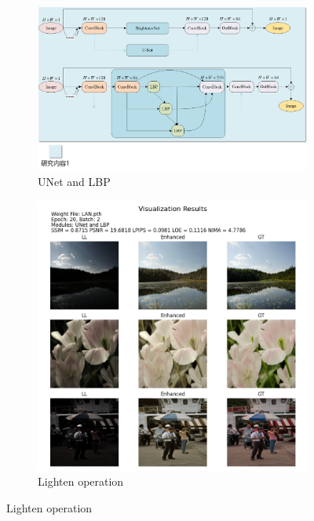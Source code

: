 \documentclass[a4paper]{ctexart}
\begin{document}
	\begin{figure}[htbp]
		\centering
		\begin{subfigure}{0.8\textwidth}
			\includegraphics[width=\linewidth]{picture/LLIE/Experiment/UNet and LBP}
			\captionsetup{font=scriptsize}
			\caption{UNet and LBP}
			\label{fig: UNet and LBP}
		\end{subfigure}
		\begin{subfigure}{0.8\textwidth}
			\includegraphics[width=\linewidth]{picture/LLIE/Experiment/myplot_LAN}
			\captionsetup{font=scriptsize}
			\caption{Lighten operation}
			\label{fig：myplot_LAN}
		\end{subfigure}
	\end{figure}
	
\end{document}

